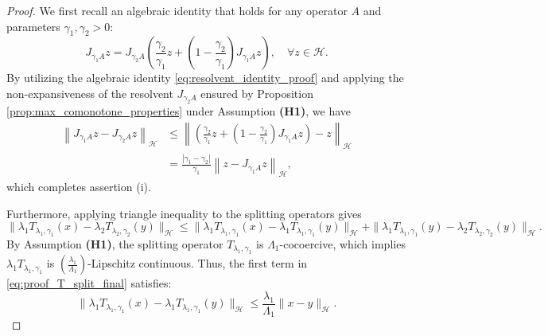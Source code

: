 \documentclass{article}
\theoremstyle{definition}
\theoremstyle{definition}
\theoremstyle{definition}
\begin{document}
\begin{proof}
We first recall an algebraic identity that holds for any operator $A$ and parameters $\gamma_1, \gamma_2 > 0$:
\begin{equation}
\label{eq:resolvent_identity_proof}
J_{\gamma_1 A} z = J_{\gamma_2 A} \left( \frac{\gamma_2}{\gamma_1} z + \left( 1 - \frac{\gamma_2}{\gamma_1} \right) J_{\gamma_1 A} z \right), \quad \forall z \in \mathcal{H}.
\end{equation}
By utilizing the algebraic identity \eqref{eq:resolvent_identity_proof} and applying the non-expansiveness of the resolvent $J_{\gamma_2 A}$ ensured by Proposition \ref{prop:max_comonotone_properties} under Assumption {\bf (H1)}, we have
\begin{align}
\left\| J_{\gamma_1 A} z - J_{\gamma_2 A} z \right\|_{\mathcal{H}}
&\le \left\| \left( \frac{\gamma_2}{\gamma_1} z + \left( 1 - \frac{\gamma_2}{\gamma_1} \right) J_{\gamma_1 A} z \right) - z \right\|_{\mathcal{H}} \nonumber \\
&= \frac{|\gamma_1 - \gamma_2|}{\gamma_1} \left\| z - J_{\gamma_1 A} z \right\|_{\mathcal{H}},
\label{eq:resolvent_sensitivity_chain}
\end{align}
which completes assertion (i).

Furthermore, applying triangle inequality to the splitting operators gives
\begin{equation}
\label{eq:proof_T_split_final}
\|\lambda_1 T_{\lambda_1, \gamma_1}(x) - \lambda_2 T_{\lambda_2, \gamma_2}(y)\|_{\mathcal{H}} \leq \|\lambda_1 T_{\lambda_1, \gamma_1}(x) - \lambda_1 T_{\lambda_1, \gamma_1}(y)\|_{\mathcal{H}} + \|\lambda_1 T_{\lambda_1, \gamma_1}(y) - \lambda_2 T_{\lambda_2, \gamma_2}(y)\|_{\mathcal{H}}.
\end{equation}
By Assumption {\bf (H1)}, the splitting operator $T_{\lambda_1, \gamma_1}$ is $\Lambda_1$-cocoercive, which implies $\lambda_1 T_{\lambda_1, \gamma_1}$ is $\left( \frac{\lambda_1}{\Lambda_1} \right)$-Lipschitz continuous. Thus, the first term in \eqref{eq:proof_T_split_final} satisfies:
\begin{equation}\label{eq:proof_T_lip_term}
\|\lambda_1 T_{\lambda_1, \gamma_1}(x) - \lambda_1 T_{\lambda_1, \gamma_1}(y)\|_{\mathcal{H}} \leq \frac{\lambda_1}{\Lambda_1} \|x - y\|_{\mathcal{H}}.
\end{equation}


\end{proof}
\end{document}
